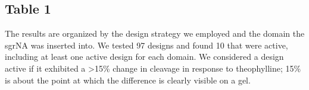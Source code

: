 \documentclass{article}
\begin{document}
\subsection{Table 1}

  The results are organized by 
the design strategy we employed and the domain the sgrNA was inserted into.  We 
tested 97 designs and found 10 that were active, including at least one active 
design for each domain.  We considered a design active if it exhibited a >15\% 
change in cleavage in response to theophylline; 15\% is about the point at 
which the difference is clearly visible on a gel.


\printbibliography[title=References]

\beginsupplement
\end{document}
